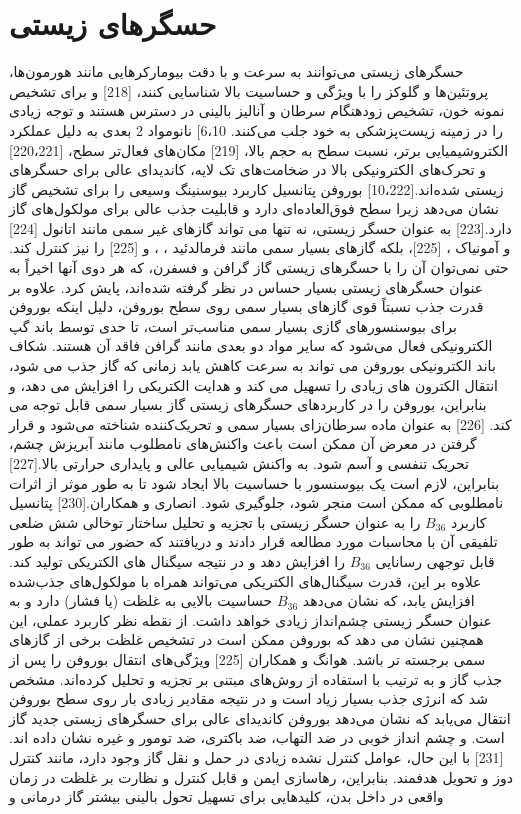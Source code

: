 \section{حسگرهای زیستی}
حسگرهای زیستی می‌توانند به سرعت و با دقت بیومارکرهایی مانند هورمون‌ها، پروتئین‌ها و گلوکز را با ویژگی و حساسیت بالا شناسایی کنند، [218] و برای تشخیص نمونه خون، تشخیص زودهنگام سرطان و آنالیز بالینی در دسترس هستند و توجه زیادی را در زمینه زیست‌پزشکی به خود جلب می‌کنند. 6،10] نانومواد 2 بعدی به دلیل عملکرد الکتروشیمیایی برتر، نسبت سطح به حجم بالا، [219] مکان‌های فعال‌تر سطح، [220،221] و تحرک‌های الکترونیکی بالا در ضخامت‌های تک لایه، کاندیدای عالی برای حسگرهای زیستی شده‌اند.[10،222] بوروفن پتانسیل کاربرد بیوسنینگ وسیعی را برای تشخیص گاز نشان می‌دهد زیرا سطح فوق‌العاده‌ای دارد و قابلیت جذب عالی برای مولکول‌های گاز دارد.[223] به عنوان حسگر زیستی، نه تنها می تواند گازهای غیر سمی مانند اتانول  [224] و آمونیاک ، [225]، بلکه گازهای بسیار سمی مانند فرمالدئید ، ، و  [225] را نیز کنترل کند. حتی نمی‌توان آن را با حسگرهای زیستی گاز گرافن و فسفرن، که هر دوی آنها اخیراً به عنوان حسگرهای زیستی بسیار حساس در نظر گرفته شده‌اند، پایش کرد. علاوه بر قدرت جذب نسبتاً قوی گازهای بسیار سمی روی سطح بوروفن، دلیل اینکه بوروفن برای بیوسنسورهای گازی بسیار سمی مناسب‌تر است، تا حدی توسط باند گپ الکترونیکی فعال می‌شود که سایر مواد دو بعدی مانند گرافن فاقد آن هستند. شکاف باند الکترونیکی بوروفن می تواند به سرعت کاهش یابد زمانی که گاز جذب می شود، انتقال الکترون های زیادی را تسهیل می کند و هدایت الکتریکی را افزایش می دهد، و بنابراین، بوروفن را در کاربردهای حسگرهای زیستی گاز بسیار سمی قابل توجه می کند. [226]  به عنوان ماده سرطان‌زای بسیار سمی و تحریک‌کننده شناخته می‌شود و قرار گرفتن در معرض آن ممکن است باعث واکنش‌های نامطلوب مانند آبریزش چشم، تحریک تنفسی و آسم شود. به واکنش شیمیایی عالی و پایداری حرارتی بالا.[227] بنابراین، لازم است یک بیوسنسور  با حساسیت بالا ایجاد شود تا به طور موثر از اثرات نامطلوبی که  ممکن است منجر شود، جلوگیری شود. انصاری و همکاران.[230] پتانسیل کاربرد $B_{36}$ را به عنوان حسگر زیستی  با تجزیه و تحلیل ساختار توخالی شش ضلعی تلفیقی آن با محاسبات  مورد مطالعه قرار دادند و دریافتند که حضور  می تواند به طور قابل توجهی رسانایی $B_{36}$ را افزایش دهد و در نتیجه سیگنال های الکتریکی تولید کند. علاوه بر این، قدرت سیگنال‌های الکتریکی می‌تواند همراه با مولکول‌های جذب‌شده  افزایش یابد، که نشان می‌دهد $B_{36}$ حساسیت بالایی به غلظت (یا فشار)  دارد و به عنوان حسگر زیستی  چشم‌انداز زیادی خواهد داشت. از نقطه نظر کاربرد عملی، این همچنین نشان می دهد که بوروفن ممکن است در تشخیص غلظت برخی از گازهای سمی برجسته تر باشد. هوانگ و همکاران [225] ویژگی‌های انتقال بوروفن را پس از جذب گاز  و  به ترتیب با استفاده از روش‌های مبتنی بر  تجزیه و تحلیل کرده‌اند. مشخص شد که انرژی جذب بسیار زیاد است و در نتیجه مقادیر زیادی بار روی سطح بوروفن انتقال می‌یابد که نشان می‌دهد بوروفن کاندیدای عالی برای حسگرهای زیستی جدید گاز است.  و  چشم انداز خوبی در ضد التهاب، ضد باکتری، ضد تومور و غیره نشان داده اند.[231] با این حال، عوامل کنترل نشده زیادی در حمل و نقل گاز وجود دارد، مانند کنترل دوز و تحویل هدفمند. بنابراین، رهاسازی ایمن و قابل کنترل و نظارت بر غلظت در زمان واقعی در داخل بدن، کلیدهایی برای تسهیل تحول بالینی بیشتر گاز درمانی  و  